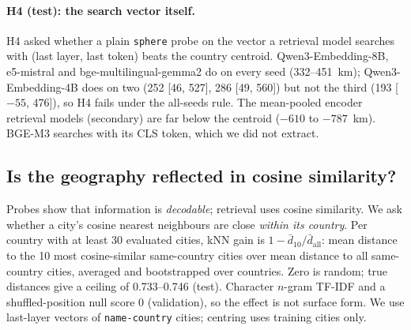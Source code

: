 \paragraph{H4 (test): the search vector itself.}
H4 asked whether a plain \texttt{sphere} probe on the vector a retrieval model searches with (last layer, last token) beats the country centroid. Qwen3-Embedding-8B, e5-mistral and bge-multilingual-gemma2 do on every seed (332--451~km); Qwen3-Embedding-4B does on two (252 [46, 527], 286 [49, 560]) but not the third (193 [$-55$, 476]), so H4 fails under the all-seeds rule. The mean-pooled encoder retrieval models (secondary) are far below the centroid ($-610$ to $-787$~km). BGE-M3 searches with its CLS token, which we did not extract.

\subsection{Is the geography reflected in cosine similarity?}
\label{sec:res-reflected}

Probes show that information is \emph{decodable}; retrieval uses cosine similarity. We ask whether a city's cosine nearest neighbours are close \emph{within its country}. Per country with at least 30 evaluated cities, kNN gain is $1-\bar d_{10}/\bar d_{\mathrm{all}}$: mean distance to the 10 most cosine-similar same-country cities over mean distance to all same-country cities, averaged and bootstrapped over countries. Zero is random; true distances give a ceiling of 0.733--0.746 (test). Character $n$-gram TF-IDF and a shuffled-position null score 0 (validation), so the effect is not surface form. We use last-layer vectors of \texttt{name-country} cities; centring uses training cities only.

